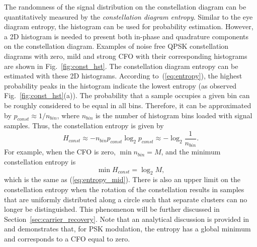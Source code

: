 \documentclass[12pt, draftclsnofoot, onecolumn]{IEEEtran}
\begin{document}
The randomness of the signal distribution on the constellation diagram can be quantitatively measured by the \textit{constellation diagram entropy}.
Similar to the eye diagram entropy, the histogram can be used for probability estimation.
However, a 2D histogram is needed to present both in-phase and quadrature components on the constellation diagram.
Examples of noise free QPSK constellation diagrams with zero, mild and strong CFO with their corresponding histograms are shown in Fig.~\ref{fig:const_hst}.
The constellation diagram entropy can be estimated with these 2D histograms.
According to~(\ref{eq:entropy}), the highest probability peaks in the histogram indicate the lowest entropy (as observed Fig.~\ref{fig:const_hst}(a)).
The probability that a sample occupies a given bin can be roughly considered to be equal in all bins. 
Therefore, it can be approximated by \(p_{const} \approx {1}/{n_{bin}}\), where \(n_{bin}\) is the number of histogram bins loaded with signal samples.
Thus, the constellation entropy is given by
\begin{equation}
H_{const} \approx - n_{bin} p_{const} \log_2 {p_{const}} \approx -\log_2 {\frac{1}{n_{bin}}}.
\label{eq:const_ent}
\end{equation}
For example, when the CFO is zero, \(\min{n_{bin}}=M\),  and the minimum constellation entropy is
\begin{equation}
\min{H_{const}=\log_2 {M}},
\end{equation}
which is the same as (\ref{eq:entropy_mid}).
There is also an upper limit on the constellation entropy 
when the rotation of the constellation results in samples that are uniformly distributed along a circle such that separate clusters can no longer be distinguished.  
% 
% 
This phenomenon will be further discussed in Section~\ref{sec:carrier_recovery}.
Note that an analytical discussion is provided in \cite{Pedzisz2006} and demonstrates that, for PSK modulation,
the entropy has a global minimum and corresponds to a CFO equal to zero.
\end{document}
